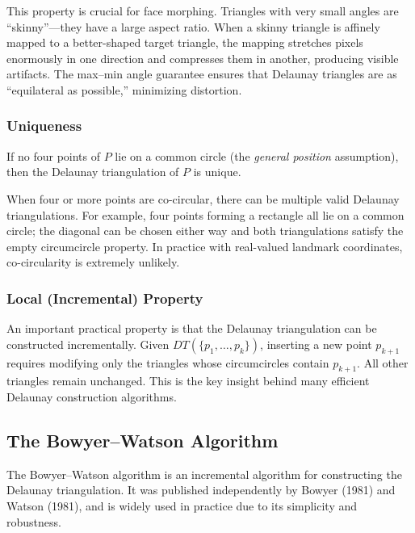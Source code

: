This property is crucial for face morphing.  Triangles with very small angles
are ``skinny''---they have a large aspect ratio.  When a skinny triangle is
affinely mapped to a better-shaped target triangle, the mapping stretches
pixels enormously in one direction and compresses them in another, producing
visible artifacts.  The max--min angle guarantee ensures that Delaunay
triangles are as ``equilateral as possible,'' minimizing distortion.

\subsubsection*{Uniqueness}

\begin{proposition}
    If no four points of $P$ lie on a common circle (the \emph{general
    position} assumption), then the Delaunay triangulation of $P$ is unique.
\end{proposition}

When four or more points are co-circular, there can be multiple valid Delaunay
triangulations.  For example, four points forming a rectangle all lie on a
common circle; the diagonal can be chosen either way and both triangulations
satisfy the empty circumcircle property.  In practice with real-valued landmark
coordinates, co-circularity is extremely unlikely.

\subsubsection*{Local (Incremental) Property}

An important practical property is that the Delaunay triangulation can be
constructed incrementally.  Given $DT(\{p_1, \dots, p_k\})$, inserting a new
point $p_{k+1}$ requires modifying only the triangles whose circumcircles
contain $p_{k+1}$.  All other triangles remain unchanged.  This is the key
insight behind many efficient Delaunay construction algorithms.

\subsection{The Bowyer--Watson Algorithm}

The Bowyer--Watson algorithm is an incremental algorithm for constructing the
Delaunay triangulation.  It was published independently by Bowyer (1981) and
Watson (1981), and is widely used in practice due to its simplicity and
robustness.

